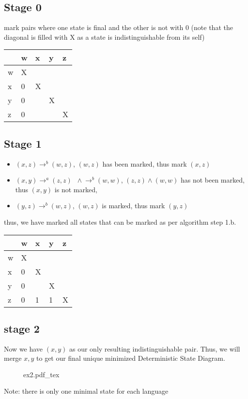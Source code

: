 \documentclass[12pt]{book}
\newcommand{\incfig}[1]{%
    {#1.pdf_tex}
}
\begin{document}
\subsection*{Stage 0}
mark pairs where one state is final and the other is not with 0
(note that the diagonal is filled with X as a state is indistinguishable from its self)

\begin{table}[ht]
\centering
\begin{tabular}{@{}lllll@{}}
\toprule
  & w & x & y & z \\ \midrule
w & X &   &   &   \\
x & 0 & X &   &   \\
y & 0 &   & X &   \\
z & 0 &   &   & X \\ \bottomrule
\end{tabular}
\end{table}

\subsection*{Stage 1}
\begin{itemize}
        \item $(x,z)\rightarrow^b (w,z)$, $(w,z)$ has been marked, thus mark  $(x,z)$
        \item $(x,y)\rightarrow^a(z,z)\;\;\wedge\rightarrow^b(w,w)$,  $(z,z)\wedge(w,w)$ has not been marked, thus $(x,y)$  is not marked,
        \item $(y,z)\rightarrow^b(w,z)$, $(w,z)$ is marked, thus mark  $(y,z)$
\end{itemize}
thus, we have marked all states that can be marked as per algorithm step 1.b.
\begin{table}[ht]
\centering
\begin{tabular}{@{}lllll@{}}
\toprule
  & w & x & y & z \\ \midrule
w & X &   &   &   \\
x & 0 & X &   &   \\
y & 0 &   & X &   \\
z & 0 & 1 & 1 & X \\ \bottomrule
\end{tabular}
\end{table}
\pagebreak


\subsection*{stage 2}
Now we have $(x,y)$ as our only resulting indistinguishable pair.
Thus, we will merge  $x,y$ to get our final unique minimized Deterministic State Diagram.
 \begin{figure}[h]
         \centering
         \incfig{ex2}
        
\end{figure}

Note: there is only one minimal state for each language
\end{document}
